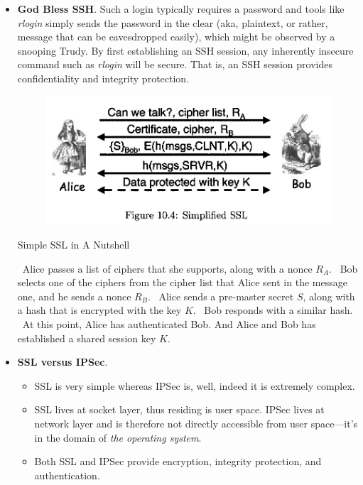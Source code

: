 \documentclass[twocolumn]{article}
\begin{document}
\begin{itemize}
\begin{figure}[htbp]
  \end{figure}
\item \textbf{God Bless SSH}. Such a login typically requires a
  password and tools like \emph{rlogin} simply sends the password in
  the clear (aka, plaintext, or rather, message that can be
  eavesdropped easily), which might be observed by a snooping
  Trudy. By first establishing an SSH session, any inherently insecure
  command such as \emph{rlogin} will be secure. That is, an SSH
  session provides confidentiality and integrity protection.
  \begin{figure}[htbp]
    \centering
    \label{fig:simplified-ssl}
    \includegraphics[scale=0.28]{Simplified-SSL}
  \end{figure}
  \begin{algorithm}
    \caption{Simple SSL in A Nutshell}
    \label{sec:simple-ssl-in-nutshell}
    \begin{algorithmic}[1]
      \STATE~Alice passes a list of ciphers that she supports, along
      with a nonce $R_{A}$.
      \STATE~Bob selects one of the ciphers from the cipher list that
      Alice sent in the message one, and he sends a nonce $R_{B}$.
      \STATE~Alice sends a pre-master secret $S$, along with a hash
      that is encrypted with the key $K$.
      \STATE~Bob responds with a similar hash.
      \STATE~At this point, Alice has authenticated Bob. And Alice and
      Bob has established a shared session key $K$.
    \end{algorithmic}
  \end{algorithm}

\item \textbf{SSL versus IPSec}. 
  \begin{itemize}
  \item SSL is very simple whereas IPSec is, well, indeed it is
    extremely complex.
  \item SSL lives at socket layer, thus residing is user space. IPSec
    lives at network layer and is therefore not directly accessible
    from user space---it's in the domain of \emph{the operating
      system}. 
  \item Both SSL and IPSec provide encryption, integrity protection,
    and authentication.
  \end{itemize}


\end{itemize}
\end{document}
